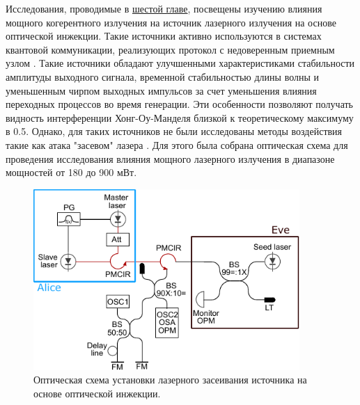 \newpage Исследования, проводимые в \underline{шестой главе}, посвещены изучению влияния мощного когерентного излучения на источник лазерного излучения на основе оптической инжекции. Такие источники активно используются в системах квантовой коммуникации, реализующих протокол с недоверенным приемным узлом \cite{comandar2016,yuan2016,roberts2018}. Такие источники обладают улучшенными характеристиками стабильности амплитуды выходного сигнала, временной стабильностью длины волны и уменьшенным чирпом выходных импульсов за счет уменьшения влияния переходных процессов во время генерации. Эти особенности позволяют получать видность интерференции Хонг-Оу-Манделя близкой к теоретическому максимуму в 0.5. 
\newline Однако, для таких источников не были исследованы методы воздействия такие как атака "засевом" лазера \cite{fadeev2024a}. Для этого была собрана оптическая схема для проведения исследования влияния мощного лазерного излучения в диапазоне мощностей от 180 до 900 мВт. 
\begin{figure}
    \centering
    \includegraphics[width=0.9\textwidth]{images/setup_Faraday_Mirrors_final.pdf}
    \caption{Оптическая схема установки лазерного засеивания источника на основе оптической инжекции.}
    \label{fig:enter-label}
\end{figure}

